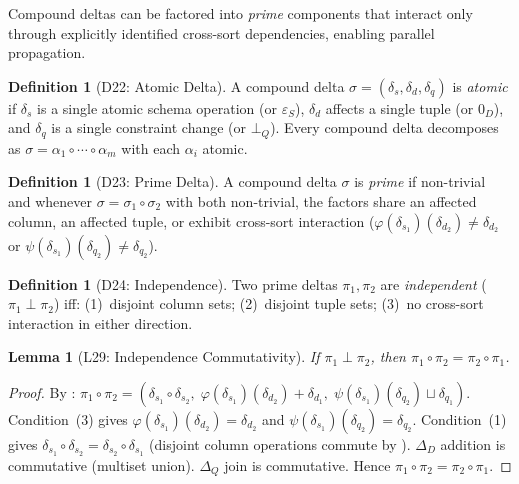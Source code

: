 \documentclass[11pt,a4paper]{article}
\newtheorem{lemma}[theorem]{Lemma}
\theoremstyle{definition}
\newtheorem{definition}[theorem]{Definition}
\newcommand{\DeltaD}{\Delta_{\!D}}
\newcommand{\DeltaQ}{\Delta_{\!Q}}
\newcommand{\epsS}{\varepsilon_S}
\newcommand{\zeroD}{0_D}
\newcommand{\botQ}{\bot_Q}
\begin{document}
Compound deltas can be factored into \emph{prime} components that interact only
through explicitly identified cross-sort dependencies, enabling parallel
propagation.

\begin{definition}[D22: Atomic Delta]\label{def:atomic-delta}
A compound delta $\sigma = (\delta_s, \delta_d, \delta_q)$ is \emph{atomic} if
$\delta_s$ is a single atomic schema operation (or $\epsS$),
$\delta_d$ affects a single tuple (or $\zeroD$), and
$\delta_q$ is a single constraint change (or $\botQ$).
Every compound delta decomposes as $\sigma = \alpha_1 \circ \cdots \circ \alpha_m$
with each $\alpha_i$ atomic.
\end{definition}

\begin{definition}[D23: Prime Delta]\label{def:prime-delta}
A compound delta $\sigma$ is \emph{prime} if non-trivial and whenever
$\sigma = \sigma_1 \circ \sigma_2$ with both non-trivial, the factors share
an affected column, an affected tuple, or exhibit cross-sort interaction
($\varphi(\delta_{s_1})(\delta_{d_2}) \neq \delta_{d_2}$ or
$\psi(\delta_{s_1})(\delta_{q_2}) \neq \delta_{q_2}$).
\end{definition}

\begin{definition}[D24: Independence]\label{def:independence}
Two prime deltas $\pi_1, \pi_2$ are \emph{independent} ($\pi_1 \perp \pi_2$) iff:
(1)~disjoint column sets;
(2)~disjoint tuple sets;
(3)~no cross-sort interaction in either direction.
\end{definition}

\begin{lemma}[L29: Independence Commutativity]\label{lem:independence}
If $\pi_1 \perp \pi_2$, then $\pi_1 \circ \pi_2 = \pi_2 \circ \pi_1$.
\end{lemma}

\begin{proof}
By :
$\pi_1 \circ \pi_2 = (\delta_{s_1} \circ \delta_{s_2},\;
\varphi(\delta_{s_1})(\delta_{d_2}) + \delta_{d_1},\;
\psi(\delta_{s_1})(\delta_{q_2}) \sqcup \delta_{q_1})$.
Condition~(3) gives $\varphi(\delta_{s_1})(\delta_{d_2}) = \delta_{d_2}$ and
$\psi(\delta_{s_1})(\delta_{q_2}) = \delta_{q_2}$.
Condition~(1) gives $\delta_{s_1} \circ \delta_{s_2} = \delta_{s_2} \circ \delta_{s_1}$
(disjoint column operations commute by ).
$\DeltaD$ addition is commutative (multiset union).  $\DeltaQ$ join is
commutative.  Hence $\pi_1 \circ \pi_2 = \pi_2 \circ \pi_1$.
\end{proof}
\end{document}
